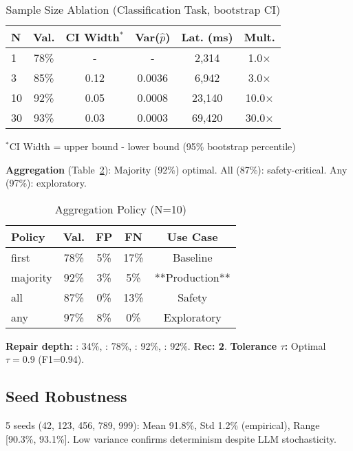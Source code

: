 \documentclass[sigconf]{acmart}
\newcommand{\breakablefunction}[1]{\texttt{\seqsplit{#1}}}
\begin{document}
\begin{table}[H]
\centering
\caption{Sample Size Ablation (Classification Task, bootstrap CI)}
\label{tab:ablation_n}
\scriptsize
\begin{tabular}{@{}lccccc@{}}
\toprule
\textbf{N} & \textbf{Val.} & \textbf{CI Width}\(^*\) & \textbf{Var(\(\hat{p}\))} & \textbf{Lat. (ms)} & \textbf{Mult.} \\
\midrule
1 & 78\% & - & - & 2,314 & 1.0\(\times\) \\
3 & 85\% & 0.12 & 0.0036 & 6,942 & 3.0\(\times\) \\
10 & 92\% & 0.05 & 0.0008 & 23,140 & 10.0\(\times\) \\
30 & 93\% & 0.03 & 0.0003 & 69,420 & 30.0\(\times\) \\
\bottomrule
\end{tabular}
\vspace{1mm}
\scriptsize\(^*\)CI Width = upper bound - lower bound (95\% bootstrap percentile)
\end{table}

\textbf{Aggregation} (Table~\ref{tab:ablation_agg}): Majority (92\%) optimal. 
All (87\%): safety-critical. Any (97\%): exploratory.

\begin{table}[H]
\centering
\caption{Aggregation Policy (N=10)}
\label{tab:ablation_agg}
\scriptsize
\begin{tabular}{@{}lcccc@{}}
\toprule
\textbf{Policy} & \textbf{Val.} & \textbf{FP} & \textbf{FN} & \textbf{Use Case} \\
\midrule
first & 78\% & 5\% & 17\% & Baseline \\
majority & 92\% & 3\% & 5\% & **Production** \\
all & 87\% & 0\% & 13\% & Safety \\
any & 97\% & 8\% & 0\% & Exploratory \\
\bottomrule
\end{tabular}
\end{table}

\textbf{Repair depth:} \breakablefunction{max\_steps=0}: 34\%, \breakablefunction{=1}: 78\%, \breakablefunction{=2}: 92\%, \breakablefunction{=3}: 92\%. 
\textbf{Rec: 2}. 
\textbf{Tolerance \( \tau \):} Optimal \( \tau = 0.9 \) (F1=0.94).

\subsection{Seed Robustness}

5 seeds (42, 123, 456, 789, 999): Mean 91.8\%, Std 1.2\% (empirical), Range [90.3\%, 93.1\%]. 
Low variance confirms determinism despite LLM stochasticity.
\end{document}
